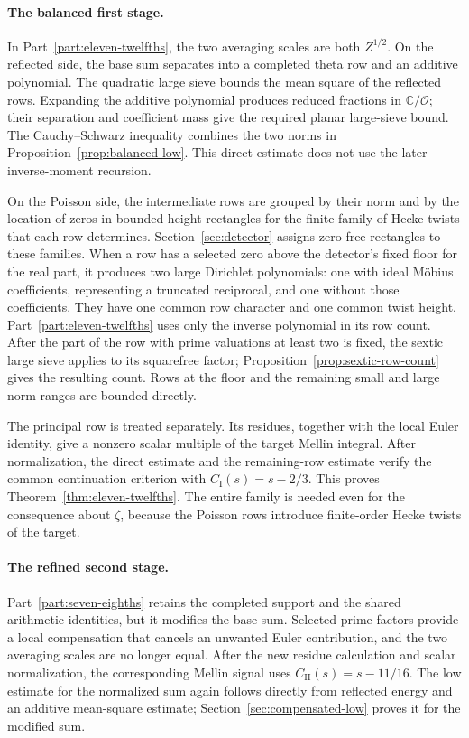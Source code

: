 \documentclass[11pt,a4paper]{article}
\numberwithin{equation}{section}
\numberwithin{figure}{section}
\theoremstyle{definition}
\theoremstyle{remark}
\begin{document}
\paragraph{The balanced first stage.}
In Part~\ref{part:eleven-twelfths}, the two averaging scales are both
$Z^{1/2}$. On the reflected side, the base sum separates into a completed
theta row and an additive polynomial. The quadratic large sieve bounds
the mean square of the reflected rows. Expanding the additive polynomial
produces reduced fractions in $\mathbb C/\mathcal O$; their separation and
coefficient mass give the required planar large-sieve bound. The
Cauchy--Schwarz inequality combines the two norms in
Proposition~\ref{prop:balanced-low}.
This direct estimate does not use the later inverse-moment recursion.

On the Poisson side, the intermediate rows are grouped by their norm and by
the location of zeros in bounded-height rectangles for the finite family
of Hecke twists that each row determines. Section~\ref{sec:detector} assigns
zero-free rectangles to these families. When a row has a selected zero
above the detector's fixed floor for the real part, it produces two large
Dirichlet polynomials: one with
ideal M\"obius coefficients, representing a truncated reciprocal, and one
without those coefficients. They have one common row character and one
common twist height. Part~\ref{part:eleven-twelfths} uses only the inverse
polynomial in its row count. After the part of the row with prime valuations
at least two is fixed, the sextic large sieve applies to its squarefree
factor; Proposition~\ref{prop:sextic-row-count} gives the resulting count.
Rows at the floor and the remaining small and large norm ranges are bounded
directly.

The principal row is treated separately. Its residues, together with the
local Euler identity, give a nonzero scalar multiple of the target Mellin
integral. After normalization, the direct estimate and the remaining-row
estimate verify the common continuation criterion with
$C_{\mathrm I}(s)=s-2/3$. This proves
Theorem~\ref{thm:eleven-twelfths}. The entire family is needed even for the
consequence about $\zeta$, because the Poisson rows introduce finite-order
Hecke twists of the target.

\paragraph{The refined second stage.}
Part~\ref{part:seven-eighths} retains the completed support and the shared
arithmetic identities, but it modifies the base sum. Selected prime factors
provide a local compensation that cancels an unwanted Euler contribution,
and the two averaging scales are no longer equal. After the new residue
calculation and scalar normalization, the corresponding Mellin signal uses
$C_{\mathrm{II}}(s)=s-11/16$. The low estimate for the normalized sum again
follows directly from reflected energy and an additive mean-square estimate;
Section~\ref{sec:compensated-low} proves it for the modified sum.
\end{document}
